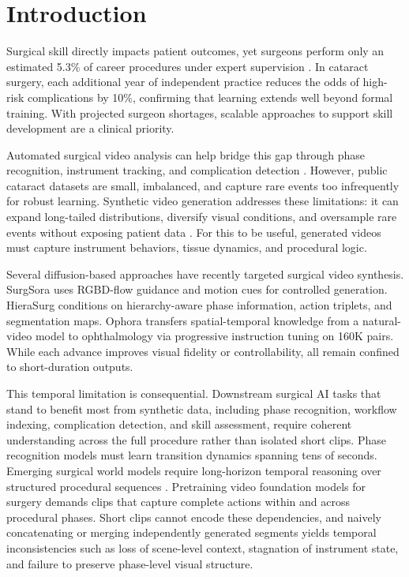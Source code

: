 \documentclass[runningheads]{llncs}
\begin{document}
\section{Introduction}
Surgical skill directly impacts patient outcomes, yet surgeons perform only an estimated 5.3\% of career procedures under expert supervision \cite{valentine2011general}. In cataract surgery, each additional year of independent practice reduces the odds of high-risk complications by 10\%\cite{awshah2024current}, confirming that learning extends well beyond formal training. With projected surgeon shortages, scalable approaches to support skill development are a clinical priority.

Automated surgical video analysis can help bridge this gap through phase recognition, instrument tracking, and complication detection \cite{shah2025step,padoy2019machine}. However, public cataract datasets are small, imbalanced, and capture rare events too infrequently for robust learning\cite{lecuyer2020assisted,padoy2019machine}. Synthetic video generation addresses these limitations: it can expand long-tailed distributions, diversify visual conditions, and oversample rare events without exposing patient data \cite{ozawa2021synthetic,su2021local}. For this to be useful, generated videos must capture instrument behaviors, tissue dynamics, and procedural logic.

Several diffusion-based approaches have recently targeted surgical video synthesis. SurgSora \cite{chen2024surgsoradecoupledrgbdflow} uses RGBD-flow guidance and motion cues for controlled generation. HieraSurg \cite{biagini2025hierasurghierarchyawarediffusion} conditions on hierarchy-aware phase information, action triplets, and segmentation maps. Ophora \cite{LiWei_Ophora_MICCAI2025} transfers spatial-temporal knowledge from a natural-video model to ophthalmology via progressive instruction tuning on 160K pairs. While each advance improves visual fidelity or controllability, all remain confined to short-duration outputs.

This temporal limitation is consequential. Downstream surgical AI tasks that stand to benefit most from synthetic data, including phase recognition, workflow indexing, complication detection, and skill assessment, require coherent understanding across the full procedure rather than isolated short clips. Phase recognition models must learn transition dynamics spanning tens of seconds. Emerging surgical world models require long-horizon temporal reasoning over structured procedural sequences \cite{xu2025surgicalactionplanninglarge}. Pretraining video foundation models for surgery demands clips that capture complete actions within and across procedural phases. Short clips cannot encode these dependencies, and naively concatenating or merging independently generated segments yields temporal inconsistencies such as loss of scene-level context, stagnation of instrument state, and failure to preserve phase-level visual structure.
\end{document}
